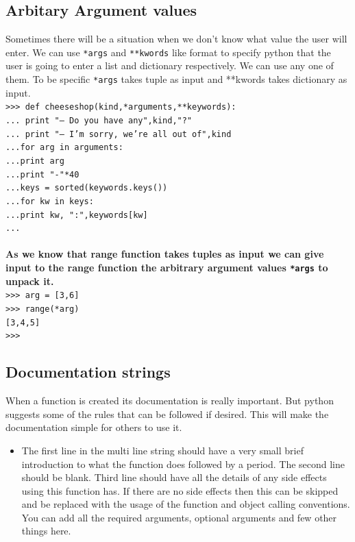 \documentclass[12pt,a4paper]{article}
\begin{document}
\subsection{Arbitary Argument values}
Sometimes there will be a situation when we don't know what value the user will enter. We can use \texttt{*args} and \texttt{**kwords} like format to specify python that the user is going to enter a list and dictionary respectively. We can use any one of them. To be specific \texttt{*args} takes tuple as input and **kwords takes dictionary as input. 
\texttt{\\
>>> def cheeseshop(kind,*arguments,**keywords):\\
...\hspace{30pt} print "-- Do you have any",kind,"?"\\
...\hspace{30pt} print "-- I'm sorry, we're all out of",kind\\
...\hspace{30pt}for arg in arguments:\\
...\hspace{30pt}\hspace{30pt}print arg\\
...\hspace{30pt}print "-"*40\\
...\hspace{30pt}keys = sorted(keywords.keys())\\
...\hspace{30pt}for kw in keys:\\
...\hspace{60pt}print kw, ":",keywords[kw]\\
...\\
}
\\
\textbf{As we know that range function takes tuples as input we can give input to the range function the arbitrary argument values \texttt{*args} to unpack it.}\\
\texttt{>>> arg = [3,6]\\
>>> range(*arg)\\
{[3,4,5]}\\
>>>
}

\subsection{Documentation strings}
When a function is created its documentation is really important. But python suggests some of the rules that can be followed if desired. This will make the documentation simple for others to use it. 
\begin{itemize}
\item The first line in the multi line string should have a very small brief introduction to what the function does followed by a period.  The second line should be blank. Third line should have all the details of any side effects using this function has. If there are no side effects then this can be skipped and be replaced with the usage of the function and object calling conventions. You can add all the required arguments, optional arguments and few other things here.
\end{itemize}
\end{document}
